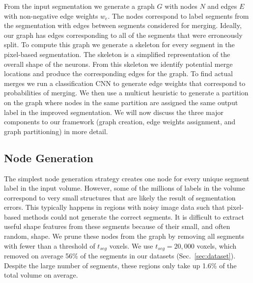 From the input segmentation we generate a graph $G$ with nodes $N$ and edges $E$ with non-negative edge weights $w_e$. The nodes correspond to label segments from the segmentation with edges between segments considered for merging. Ideally, our graph has edges corresponding to all of the segments that were erroneously split. To compute this graph we generate a skeleton for every segment in the pixel-based segmentation. The skeleton is a simplified representation of the overall shape of the neurons. From this skeleton we  identify potential merge locations and produce the corresponding edges for the graph. To find actual merges we run a classification CNN to generate edge weights that correspond to probabilities of merging. We then use a multicut heuristic to generate a partition on the graph where nodes in the same partition are assigned the same output label in the improved segmentation. We will now discuss the three major components to our framework (graph creation, edge weights assignment, and graph partitioning) in more detail.



\subsection{Node Generation}
\label{sec:skeletonization}

The simplest node generation strategy creates one node for every unique segment label in the input volume. However, some of the millions of labels in the volume correspond to very small structures that are likely the result of segmentation errors. This typically happens in regions with noisy image data such that pixel-based methods could not generate the correct segments. It is difficult to extract useful shape features from these segments because of their small, and often random, shape. We prune these nodes from the graph by removing all segments with fewer than a threshold of $t_{seg}$ voxels. We use $t_{seg} = 20,000$ voxels, which removed on average 56\% of the segments in our  datasets (Sec.~\ref{sec:dataset}). Despite the large number of segments, these regions only take up 1.6\% of the total volume on average. 

